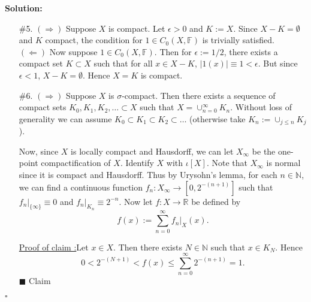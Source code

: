 \documentclass[12pt]{article}
\newcounter{ProofCounter}
\newcounter{ClaimCounter}[ProofCounter]
\newenvironment{Solution}{\stepcounter{ProofCounter}\textbf{Solution:}}{\hfill$\square$}
\newenvironment{claim}[1]{\vspace{1mm}\stepcounter{ClaimCounter}\par\noindent\underline{\bf Claim \theClaimCounter:}\space#1}{}
\newenvironment{claimproof}[1]{\par\noindent\underline{Proof of claim \theClaimCounter:}\space#1}{\hfill $\blacksquare$ Claim \theClaimCounter}
\begin{document}
\begin{Solution}
\begin{enumerate}
      \vspace{1cm}

    \item[\#5.] $(\Rightarrow)$ Suppose $X$ is compact. Let $\epsilon > 0$ and $K := X$. Since $X - K = \emptyset$ and $K$ compact, the condition for
      $1 \in C_0(X, \mathbb{F})$ is  trivially satisfied. \\

      $(\Leftarrow)$ Now suppose $1 \in C_0(X, \mathbb{F})$. Then for $\epsilon := 1/2$, there exists a compact set $K \subset X$ such that for all $x
      \in X - K$, $|1(x)| \equiv 1 < \epsilon$. But since $\epsilon < 1$, $X - K = \emptyset$. Hence $X = K$ is compact.

      \vspace{1cm}

    \item[\#6.] $(\Rightarrow)$ Suppose $X$ is $\sigma$-compact. Then there exists a sequence of compact sets $K_0, K_1, K_2, \dots \subset X$ such
      that $X = \cup_{n=0}^{\infty}K_n$. Without loss of generality we can assume $K_0 \subset K_1 \subset K_2 \subset \dots$ (otherwise take $K_n :=
      \cup_{j \leq n} K_j$). 
      
      Now, since $X$ is locally compact and Hausdorff, we can let $X_{\infty}$ be the one-point compactification of $X$. Identify $X$ with $\iota[X]$.
      Note that $X_{\infty}$ is
      normal since it is compact and Hausdorff. Thus by Urysohn's lemma, for each $n \in \mathbb{N}$, we can find a continuous function $f_{n} :
      X_{\infty} \rightarrow [0,2^{-(n+1)}]$ such that $f_{n}\big|_{\{\infty\}} \equiv 0$ and $f_{n}\big|_{K_n} \equiv 2^{-n}$. Now let $f : X \rightarrow
      \mathbb{R}$ be defined by 
      \[
        f(x) := \sum_{n=0}^{\infty} f_{n}\big|_{X}(x).
      \]
      \begin{claimproof}
        Let $x \in X$. Then there exists $N \in \mathbb{N}$ such that $x \in K_N$. Hence 
        \[
          0 < 2^{-(N+1)} < f(x) \leq \sum_{n=0}^{\infty}2^{-(n+1)} = 1.
        \]
      \end{claimproof}


\end{enumerate}
\end{Solution}
\end{document}
